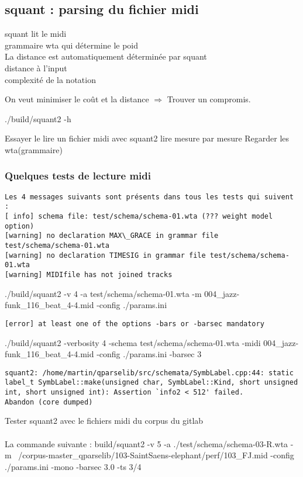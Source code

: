 \subsection{squant : parsing du fichier midi}
squant lit le midi\\
grammaire wta qui détermine le poid\\
La distance est automatiquement déterminée par squant\\
distance à l’input\\
complexité de la notation

On veut minimiser le coût et la distance $\Rightarrow$ Trouver un compromis.

./build/squant2 -h

Essayer le lire un fichier midi avec squant2
lire mesure par mesure
Regarder les wta(grammaire)

\subsubsection{Quelques tests de lecture midi}
\begin{verbatim}
Les 4 messages suivants sont présents dans tous les tests qui suivent :
[ info] schema file: test/schema/schema-01.wta (??? weight model option)
[warning] no declaration MAX\_GRACE in grammar file test/schema/schema-01.wta
[warning] no declaration TIMESIG in grammar file test/schema/schema-01.wta
[warning] MIDIfile has not joined tracks
\end{verbatim}
./build/squant2 -v 4 -a test/schema/schema-01.wta -m 004\_jazz-funk\_116\_beat\_4-4.mid -config ./params.ini
\begin{verbatim}
[error] at least one of the options -bars or -barsec mandatory
\end{verbatim}
./build/squant2 -verbosity 4 -schema test/schema/schema-01.wta -midi 004\_jazz-funk\_116\_beat\_4-4.mid -config ./params.ini -barsec 3
\begin{verbatim}
squant2: /home/martin/qparselib/src/schemata/SymbLabel.cpp:44: static label_t SymbLabel::make(unsigned char, SymbLabel::Kind, short unsigned int, short unsigned int): Assertion `info2 < 512' failed.
Abandon (core dumped)
\end{verbatim}
Tester squant2 avec le fichiers midi du corpus du gitlab\\\\
La commande suivante :
build/squant2 -v 5 -a ./test/schema/schema-03-R.wta -m ~/corpus-master\_qparselib/103-SaintSaens-elephant/perf/103\_FJ.mid -config ./params.ini -mono -barsec 3.0 -ts 3/4	


